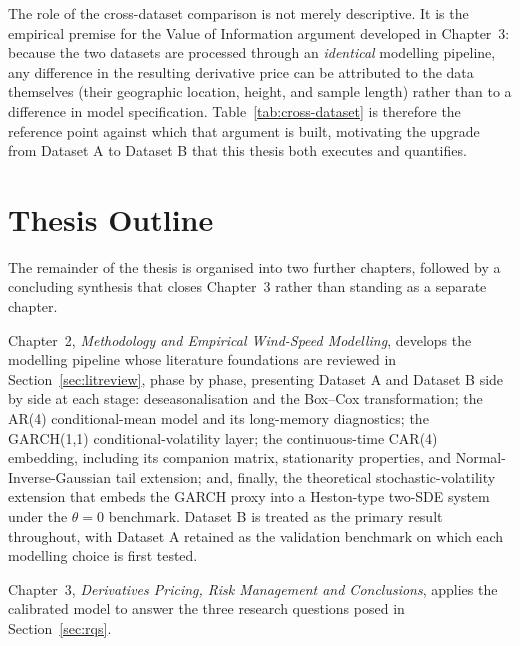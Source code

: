 \documentclass[11pt, a4paper, twoside]{article}
\begin{document}
The role of the cross-dataset comparison is not merely descriptive. It is the empirical premise for the Value of Information argument developed in Chapter~3: because the two datasets are processed through an \emph{identical} modelling pipeline, any difference in the resulting derivative price can be attributed to the data themselves (their geographic location, height, and sample length) rather than to a difference in model specification. Table~\ref{tab:cross-dataset} is therefore the reference point against which that argument is built, motivating the upgrade from Dataset A to Dataset B that this thesis both executes and quantifies.

\section{Thesis Outline}
\label{sec:outline}

The remainder of the thesis is organised into two further chapters, followed by a concluding synthesis that closes Chapter~3 rather than standing as a separate chapter.

Chapter~2, \emph{Methodology and Empirical Wind-Speed Modelling}, develops the modelling pipeline whose literature foundations are reviewed in Section~\ref{sec:litreview}, phase by phase, presenting Dataset A and Dataset B side by side at each stage: deseasonalisation and the Box--Cox transformation; the AR(4) conditional-mean model and its long-memory diagnostics; the GARCH(1,1) conditional-volatility layer; the continuous-time CAR(4) embedding, including its companion matrix, stationarity properties, and Normal-Inverse-Gaussian tail extension; and, finally, the theoretical stochastic-volatility extension that embeds the GARCH proxy into a Heston-type two-SDE system under the $\theta = 0$ benchmark. Dataset B is treated as the primary result throughout, with Dataset A retained as the validation benchmark on which each modelling choice is first tested.

Chapter~3, \emph{Derivatives Pricing, Risk Management and Conclusions}, applies the calibrated model to answer the three research questions posed in Section~\ref{sec:rqs}.
\end{document}
